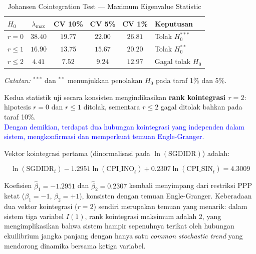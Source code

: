 \documentclass[12pt]{article}
\begin{document}
\begin{table}[H]
    \centering
    \caption{Johansen Cointegration Test --- Maximum Eigenvalue Statistic}
    \label{tab:johansen_eigen}
    \begin{tabular}{lccccl}
        \toprule
        $H_0$ & $\lambda_{\text{max}}$ & CV 10\% & CV 5\% & CV 1\% & Keputusan \\
        \midrule
        $r = 0$    & $38.40$ & $19.77$ & $22.00$ & $26.81$ & Tolak $H_0^{***}$ \\
        $r \leq 1$ & $16.90$ & $13.75$ & $15.67$ & $20.20$ & Tolak $H_0^{**}$ \\
        $r \leq 2$ & $4.41$  & $7.52$  & $9.24$  & $12.97$ & Gagal tolak $H_0$ \\
        \bottomrule
    \end{tabular}
    \begin{tablenotes}
        \small
        \item \textit{Catatan:} $^{***}$ dan $^{**}$ menunjukkan penolakan $H_0$ pada 
        taraf 1\% dan 5\%.
    \end{tablenotes}
\end{table}

Kedua statistik uji secara konsisten mengindikasikan \textbf{rank kointegrasi $r = 2$}: 
hipotesis $r = 0$ dan $r \leq 1$ ditolak, sementara $r \leq 2$ gagal ditolak bahkan 
pada taraf 10\%. \\
\textcolor{blue}{
Dengan demikian, terdapat dua hubungan kointegrasi yang independen 
dalam sistem, mengkonfirmasi dan memperkuat temuan Engle-Granger.}

Vektor kointegrasi pertama (dinormalisasi pada $\ln(\text{SGDIDR})$) adalah:

\begin{equation}
    \ln(\text{SGDIDR}_t) - 1.2951\ln(\text{CPI\_INO}_t) + 0.2307\ln(\text{CPI\_SIN}_t) 
    = 4.3009
    \label{eq:coint_vec}
\end{equation}

Koefisien $\hat{\beta}_1 = -1.2951$ dan $\hat{\beta}_2 = 0.2307$ kembali menyimpang 
dari restriksi PPP ketat ($\beta_1 = -1$, $\beta_2 = +1$), konsisten dengan temuan 
Engle-Granger. Keberadaan dua vektor kointegrasi ($r = 2$) sendiri merupakan temuan 
yang menarik: dalam sistem tiga variabel $I(1)$, rank kointegrasi maksimum adalah 2, 
yang mengimplikasikan bahwa sistem hampir sepenuhnya terikat oleh hubungan ekuilibrium 
jangka panjang dengan hanya satu \textit{common stochastic trend} yang mendorong 
dinamika bersama ketiga variabel.
\end{document}
